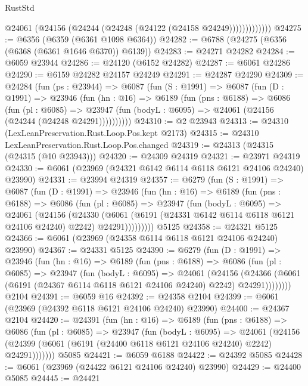 \begin{lexlean}{RustStd}
\begin{coremodule}
                  @24061 (@24156 (@24244 (@24248 (@24122 (@24158 @24249)))))))))))))
@24275 := @6356 (@6359 (@6361 @1098 @6364))
@24282 := @6788 (@24275 (@6356 (@6368 (@6361 @1646 @6370)) @6139))
@24283 := @24271 @24282
@24284 := @6059 @23944
@24286 := @24120 (@6152 @24282)
@24287 := @6061 @24286
@24290 := @6159 @24282 @24157 @24249
@24291 := @24287 @24290
@24309 := @24284
    (fun (ps : @23944) =>
    @6087
      (fun (S : @1991) =>
      @6087
        (fun (D : @1991) =>
        @23946
          (fun (hn : @16) =>
          @6189
            (fun (pns : @6188) =>
            @6086
              (fun (pl : @6085) =>
              @23947 (fun (bodyL : @6095) => @24061 (@24156 (@24244 (@24248 @24291))))))))))
@24310 := @2 @23943
@24313 := @24310 (LexLeanPreservation.Rust.Loop.Pos.kept @2173)
@24315 := @24310 LexLeanPreservation.Rust.Loop.Pos.changed
@24319 := @24313 (@24315 (@24315 (@10 @23943)))
@24320 := @24309 @24319
@24321 := @23971 @24319
@24330 := @6061 (@23969 (@24321 @6142 @6114 @6118 @6121 @24106 @24240) @23990)
@24331 := @23994 @24319
@24357 := @6279
    (fun (S : @1991) =>
    @6087
      (fun (D : @1991) =>
      @23946
        (fun (hn : @16) =>
        @6189
          (fun (pns : @6188) =>
          @6086
            (fun (pl : @6085) =>
            @23947
              (fun (bodyL : @6095) =>
              @24061
                (@24156
                  (@24330
                    (@6061
                      (@6191 (@24331 @6142 @6114 @6118 @6121 @24106 @24240) @2242)
                      @24291)))))))))
    @5125
@24358 := @24321 @5125
@24366 := @6061 (@23969 (@24358 @6114 @6118 @6121 @24106 @24240) @23990)
@24367 := @24331 @5125
@24390 := @6279
    (fun (D : @1991) =>
    @23946
      (fun (hn : @16) =>
      @6189
        (fun (pns : @6188) =>
        @6086
          (fun (pl : @6085) =>
          @23947
            (fun (bodyL : @6095) =>
            @24061
              (@24156
                (@24366 (@6061 (@6191 (@24367 @6114 @6118 @6121 @24106 @24240) @2242) @24291))))))))
    @2104
@24391 := @6059 @16
@24392 := @24358 @2104
@24399 := @6061 (@23969 (@24392 @6118 @6121 @24106 @24240) @23990)
@24400 := @24367 @2104
@24420 := @24391
    (fun (hn : @16) =>
    @6189
      (fun (pns : @6188) =>
      @6086
        (fun (pl : @6085) =>
        @23947
          (fun (bodyL : @6095) =>
          @24061
            (@24156 (@24399 (@6061 (@6191 (@24400 @6118 @6121 @24106 @24240) @2242) @24291)))))))
    @5085
@24421 := @6059 @6188
@24422 := @24392 @5085
@24428 := @6061 (@23969 (@24422 @6121 @24106 @24240) @23990)
@24429 := @24400 @5085
@24445 := @24421

\end{coremodule}
\end{lexlean}
